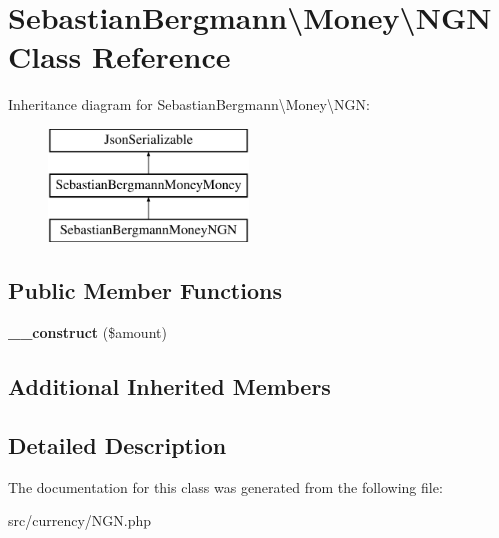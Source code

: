 \hypertarget{classSebastianBergmann_1_1Money_1_1NGN}{}\section{Sebastian\+Bergmann\textbackslash{}Money\textbackslash{}N\+G\+N Class Reference}
\label{classSebastianBergmann_1_1Money_1_1NGN}
Inheritance diagram for Sebastian\+Bergmann\textbackslash{}Money\textbackslash{}N\+G\+N\+:\begin{figure}[H]
\begin{center}
\leavevmode
\includegraphics[height=3.000000cm]{classSebastianBergmann_1_1Money_1_1NGN}
\end{center}
\end{figure}
\subsection*{Public Member Functions}
\begin{DoxyCompactItemize}
\item 
\hypertarget{classSebastianBergmann_1_1Money_1_1NGN_a1e9f65658fab63d1b82fd9ecd8917186}{}{\bfseries \+\_\+\+\_\+construct} (\$amount)\label{classSebastianBergmann_1_1Money_1_1NGN_a1e9f65658fab63d1b82fd9ecd8917186}

\end{DoxyCompactItemize}
\subsection*{Additional Inherited Members}


\subsection{Detailed Description}


The documentation for this class was generated from the following file\+:\begin{DoxyCompactItemize}
\item 
src/currency/N\+G\+N.\+php\end{DoxyCompactItemize}
